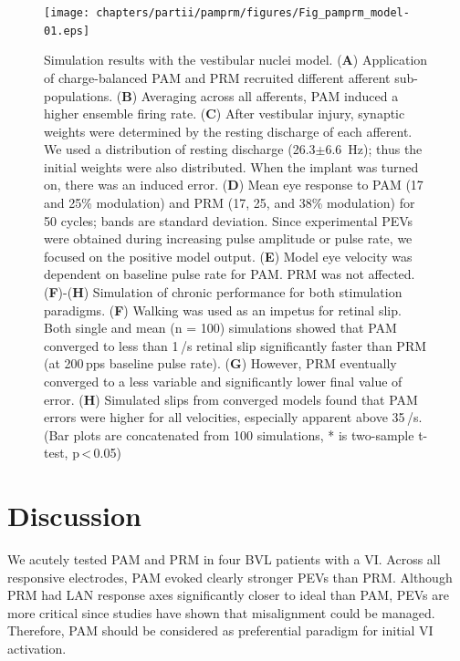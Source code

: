 \begin{figure}[btp]
\centering
\texttt{[image: chapters/partii/pamprm/figures/Fig\_pamprm\_model-01.eps]} 
\caption[Simulations result with vestibular nuclei model]{Simulation results with the vestibular nuclei model. (\textbf{A}) Application of charge-balanced PAM and PRM recruited different afferent sub-populations. (\textbf{B}) Averaging across all afferents, PAM induced a higher ensemble firing rate. (\textbf{C}) After vestibular injury,  synaptic weights were determined by the resting discharge of each afferent. We used a distribution of resting discharge (26.3$\pm$\SI{6.6}{\hertz}); thus the initial weights were also distributed. When the implant was turned on, there was an induced error. (\textbf{D}) Mean eye response to PAM (17 and 25\% modulation) and PRM (17, 25, and 38\% modulation) for 50 cycles; bands are standard deviation. Since experimental PEVs were obtained during increasing pulse amplitude or pulse rate, we focused on the positive model output. (\textbf{E}) Model eye velocity was dependent on baseline pulse rate for PAM. PRM was not affected. (\textbf{F})-(\textbf{H}) Simulation of chronic performance for both stimulation paradigms. (\textbf{F}) Walking was used as an impetus for retinal slip. Both single and mean (n = 100) simulations showed that PAM converged to less than 1\,\degree /s retinal slip significantly faster than PRM (at 200\,pps baseline pulse rate). (\textbf{G}) However, PRM eventually converged to a less variable and significantly lower final value of error. (\textbf{H}) Simulated slips from converged models found that PAM errors were higher for all velocities, especially apparent above 35\,\degree /s. (Bar plots are concatenated from 100 simulations, * is two-sample t-test, p\,\textless\,0.05)}
\label{fig:pamprm:model}
\end{figure}

\section{Discussion}
We acutely tested PAM and PRM in four BVL patients with a VI. Across all responsive electrodes, PAM evoked clearly stronger PEVs than PRM. Although PRM had LAN response axes significantly closer to ideal than PAM, PEVs are more critical since studies have shown that misalignment could be managed. Therefore, PAM should be considered as preferential paradigm for initial VI activation.  

